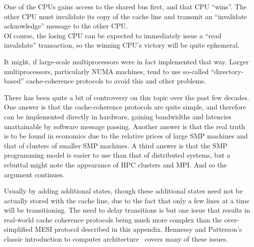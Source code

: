 One of the CPUs gains access
to the shared bus first,
and that CPU ``wins''.  The other CPU must invalidate its copy of the
cache line and transmit an ``invalidate acknowledge'' message
to the other CPU. \\
Of course, the losing CPU can be expected to immediately issue a
``read invalidate'' transaction, so the winning CPU's victory will
be quite ephemeral.


	It might, if large-scale multiprocessors were in fact implemented
	that way.  Larger multiprocessors, particularly NUMA machines,
	tend to use so-called ``directory-based'' cache-coherence
	protocols to avoid this and other problems.


	There has been quite a bit of controversy on this topic over
	the past few decades.  One answer is that the cache-coherence
	protocols are quite simple, and therefore can be implemented
	directly in hardware, gaining bandwidths and latencies
	unattainable by software message passing.  Another answer is that
	the real truth is to be found in economics due to the relative
	prices of large SMP machines and that of clusters of smaller
	SMP machines.  A third answer is that the SMP programming
	model is easier to use than that of distributed systems, but
	a rebuttal might note the appearance of HPC clusters and MPI.
	And so the argument continues.


	Usually by adding additional states, though these additional
	states need not be actually stored with the cache line, due to
	the fact that only a few lines at a time will be transitioning.
	The need to delay transitions is but one issue that results in
	real-world cache coherence protocols being much more complex than
	the over-simplified MESI protocol described in this appendix.
	Hennessy and Patterson's classic introduction to computer
	architecture~\cite{Hennessy95a} covers many of these issues.

